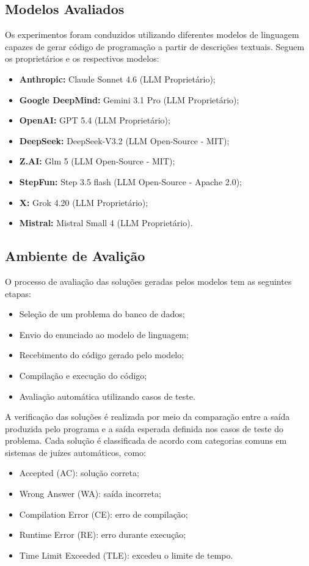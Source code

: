 \documentclass[sigconf,anonymous]{acmart} %
\begin{document}
\subsection{Modelos Avaliados}
Os experimentos foram conduzidos utilizando diferentes modelos de linguagem capazes de gerar código de programação a partir de descrições textuais. Seguem os proprietários e os respectivos modelos:

\begin{itemize}
    \item \textbf{Anthropic:} Claude Sonnet 4.6 (LLM Proprietário);
    \item \textbf{Google DeepMind:} Gemini 3.1 Pro (LLM Proprietário);
    \item \textbf{OpenAI:} GPT 5.4 (LLM Proprietário);
    \item \textbf{DeepSeek:} DeepSeek-V3.2 (LLM Open-Source - MIT);
    \item \textbf{Z.AI:} Glm 5 (LLM Open-Source - MIT);
    \item \textbf{StepFun:} Step 3.5 flash (LLM Open-Source - Apache 2.0);
    \item \textbf{X:} Grok 4.20 (LLM Proprietário);
    \item \textbf{Mistral:} Mistral Small 4 (LLM Proprietário).
\end{itemize}

\subsection{Ambiente de Avalição}
O processo de avaliação das soluções geradas pelos modelos tem as seguintes etapas:
\begin{itemize}
    \item Seleção de um problema do banco de dados;
    \item Envio do enunciado ao modelo de linguagem;
    \item Recebimento do código gerado pelo modelo;  
    \item Compilação e execução do código;
    \item Avaliação automática utilizando casos de teste.
\end{itemize}

A verificação das soluções é realizada por meio da comparação entre a saída produzida pelo programa e a saída esperada definida nos casos de teste do problema. Cada solução é classificada de acordo com categorias comuns em sistemas de juízes automáticos, como:
\begin{itemize}
    \item Accepted (AC):  solução correta;
    \item Wrong Answer (WA):  saída incorreta;
    \item Compilation Error (CE):  erro de compilação;
    \item Runtime Error (RE):  erro durante execução;
    \item Time Limit Exceeded (TLE): excedeu o limite de tempo.
\end{itemize}
\end{document}
